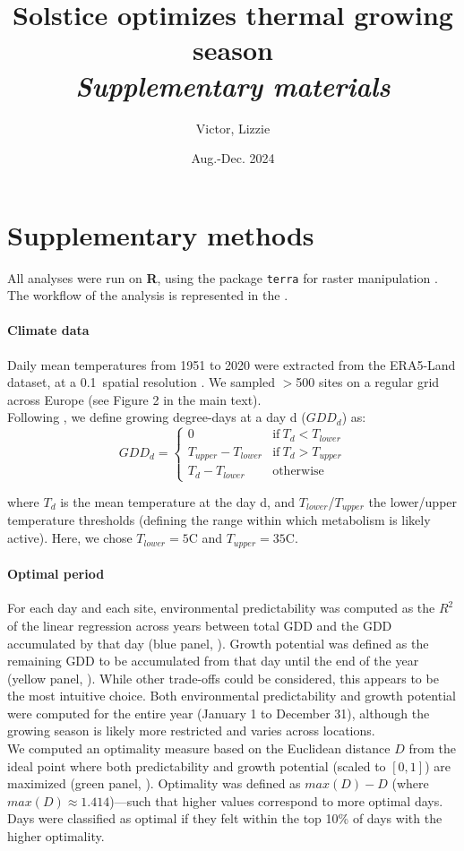 \documentclass[11pt,letter]{article}
\title{Solstice optimizes thermal growing season\\\emph{Supplementary materials}}
\author{Victor, Lizzie}
\date{Aug.-Dec. 2024}
\begin{document}
\maketitle

\section*{Supplementary methods}

All analyses were run on \textbf{\textsf{R}}, using the package \texttt{terra} for raster manipulation \citep{Hijmans2024}. The workflow of the analysis is represented in the .

\paragraph{Climate data}
Daily mean temperatures from 1951 to 2020 were extracted from the ERA5-Land dataset, at a 0.1\degree~spatial resolution \citep{MunozSabater2021}. We sampled $>$500 sites on a regular grid across Europe (see Figure 2 in the main text).\\
Following \citet{McMaster1997}, we define growing degree-days at a day d ($GDD_d$) as:
\begin{equation}
GDD_d =
\begin{cases}
    0 & \text{if}~T_d<T_{lower}\\
    T_{upper}-T_{lower} & \text{if}~T_d>T_{upper}\\
    T_d-T_{lower} & \text{otherwise}
\end{cases}       
\end{equation}

\noindent where $T_d$ is the mean temperature at the day d, and $T_{lower}$/$T_{upper}$ the lower/upper temperature thresholds (defining the range within which metabolism is likely active). Here, we chose $T_{lower}=5$\degree C and $T_{upper}=35$\degree C. 

\paragraph{Optimal period} For each day and each site, environmental predictability was computed as the $R^2$ of the linear regression across years between total GDD and the GDD accumulated by that day (blue panel, ). Growth potential was defined as the remaining GDD to be accumulated from that day until the end of the year (yellow panel, ). While other trade-offs could be considered, this appears to be the most intuitive choice. Both environmental predictability and growth potential were computed for the entire year (January 1 to December 31), although the growing season is likely more restricted and varies across locations. \\
We computed an optimality measure based on the Euclidean distance $D$ from  the ideal point where both predictability and growth potential (scaled to $[0,1]$) are maximized (green panel, ). Optimality was defined as $max(D)-D$ (where $max(D)\approx1.414$)---such that higher values correspond to more optimal days. Days were classified as optimal if they felt within the top 10\% of days with the higher optimality.
\end{document}
